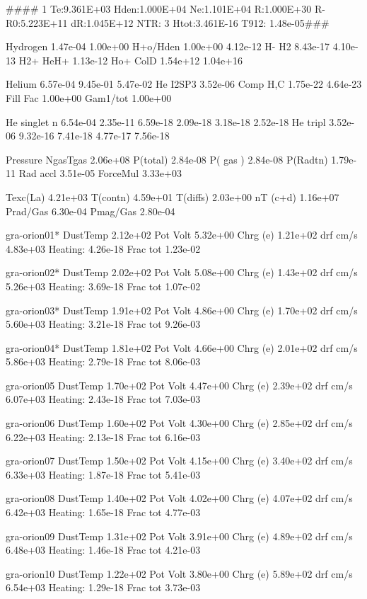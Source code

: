 {\#\#\#\#  1  Te:9.361E+03 Hden:1.000E+04 Ne:1.101E+04 R:1.000E+30
R-R0:5.223E+11 dR:1.045E+12 NTR:  3 Htot:3.461E-16 T912: 1.48e-05\#\#\#

 Hydrogen      1.47e-04 1.00e+00 H+o/Hden 1.00e+00 4.12e-12 H-    H2 8.43e-17
4.10e-13 H2+ HeH+ 1.13e-12 Ho+ ColD 1.54e+12 1.04e+16

 Helium        6.57e-04 9.45e-01 5.47e-02 He I2SP3 3.52e-06 Comp H,C 1.75e-22
4.64e-23 Fill Fac 1.00e+00 Gam1/tot 1.00e+00

 He singlet n  6.54e-04 2.35e-11 6.59e-18 2.09e-18 3.18e-18 2.52e-18 He
tripl 3.52e-06 9.32e-16 7.41e-18 4.77e-17 7.56e-18

 Pressure      NgasTgas 2.06e+08 P(total) 2.84e-08 P( gas ) 2.84e-08 P(Radtn)
1.79e-11 Rad accl 3.51e-05 ForceMul 3.33e+03

               Texc(La) 4.21e+03 T(contn) 4.59e+01 T(diffs) 2.03e+00 nT
(c+d) 1.16e+07 Prad/Gas 6.30e-04 Pmag/Gas 2.80e-04

 gra-orion01*  DustTemp 2.12e+02 Pot Volt 5.32e+00 Chrg (e) 1.21e+02 drf
cm/s 4.83e+03 Heating: 4.26e-18 Frac tot 1.23e-02

 gra-orion02*  DustTemp 2.02e+02 Pot Volt 5.08e+00 Chrg (e) 1.43e+02 drf
cm/s 5.26e+03 Heating: 3.69e-18 Frac tot 1.07e-02

 gra-orion03*  DustTemp 1.91e+02 Pot Volt 4.86e+00 Chrg (e) 1.70e+02 drf
cm/s 5.60e+03 Heating: 3.21e-18 Frac tot 9.26e-03

 gra-orion04*  DustTemp 1.81e+02 Pot Volt 4.66e+00 Chrg (e) 2.01e+02 drf
cm/s 5.86e+03 Heating: 2.79e-18 Frac tot 8.06e-03

 gra-orion05   DustTemp 1.70e+02 Pot Volt 4.47e+00 Chrg (e) 2.39e+02 drf
cm/s 6.07e+03 Heating: 2.43e-18 Frac tot 7.03e-03

 gra-orion06   DustTemp 1.60e+02 Pot Volt 4.30e+00 Chrg (e) 2.85e+02 drf
cm/s 6.22e+03 Heating: 2.13e-18 Frac tot 6.16e-03

 gra-orion07   DustTemp 1.50e+02 Pot Volt 4.15e+00 Chrg (e) 3.40e+02 drf
cm/s 6.33e+03 Heating: 1.87e-18 Frac tot 5.41e-03

 gra-orion08   DustTemp 1.40e+02 Pot Volt 4.02e+00 Chrg (e) 4.07e+02 drf
cm/s 6.42e+03 Heating: 1.65e-18 Frac tot 4.77e-03

 gra-orion09   DustTemp 1.31e+02 Pot Volt 3.91e+00 Chrg (e) 4.89e+02 drf
cm/s 6.48e+03 Heating: 1.46e-18 Frac tot 4.21e-03

 gra-orion10   DustTemp 1.22e+02 Pot Volt 3.80e+00 Chrg (e) 5.89e+02 drf
cm/s 6.54e+03 Heating: 1.29e-18 Frac tot 3.73e-03

}
